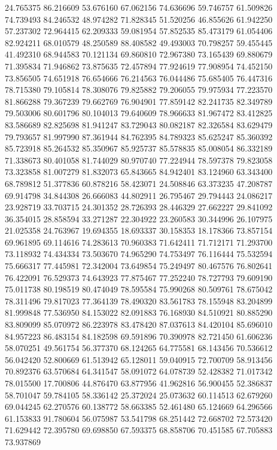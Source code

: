 24.765375
86.216609
53.676160
67.062156
74.636696
59.746757
61.509826
74.739493
84.246532
48.974282
71.828345
51.520256
46.855626
61.942250
57.237302
72.964415
62.209333
59.081954
57.852535
85.473179
61.054406
82.924211
68.010579
48.250589
88.408582
49.493003
70.798257
59.455445
41.492310
68.944583
70.121134
69.860810
72.967380
73.165439
69.880679
71.395834
71.946862
73.875635
72.457894
77.924619
77.908954
74.452150
73.856505
74.651918
76.654666
76.214563
76.044486
75.685405
76.447316
78.715380
79.105814
78.308076
79.825882
79.206055
79.975934
77.223570
81.866288
79.367239
79.662769
76.904901
77.859142
82.241735
82.349789
79.503006
80.601796
80.104013
79.640609
78.966633
81.967472
83.412825
83.586689
82.825698
81.941247
83.729043
80.082187
82.326584
83.629479
79.793657
81.997990
87.361944
84.762395
84.789323
85.625247
85.360392
85.723918
85.264532
85.350967
85.925737
85.578835
85.008054
86.332189
71.338673
80.401058
81.744029
80.970740
77.224944
78.597378
79.823058
73.323858
81.007279
81.832073
65.843665
84.942401
83.124960
63.343400
68.789812
51.377836
60.878216
58.423071
24.508846
63.373235
47.208787
69.914798
34.844308
26.666083
44.802911
26.795467
29.794443
24.086217
23.928719
33.703715
24.301352
28.726393
28.446329
27.662227
29.841092
36.354015
28.858594
33.271287
22.304922
23.260583
30.344996
26.107975
21.025358
24.763967
19.694355
18.693337
30.158353
18.178366
73.857154
69.961895
69.114616
74.283613
70.960383
71.642411
71.712171
71.293700
73.118932
74.434334
73.503670
74.965290
74.753497
76.116444
75.532594
75.666317
77.445981
72.342004
73.649854
75.249497
80.467576
76.802641
76.422091
76.529373
74.643923
77.875467
77.252240
78.727793
79.609190
75.011738
80.198519
80.474049
78.595584
75.990268
80.509761
78.675042
78.311496
79.817023
77.364139
78.490320
83.561783
78.155948
83.204899
81.999848
77.536950
84.153022
82.091883
76.168930
84.510921
80.885290
83.809099
85.070972
86.223978
83.478420
87.037613
84.420104
85.696010
84.957223
86.483154
84.182598
69.591896
70.390978
82.721450
61.606236
58.070251
49.561754
56.377370
68.124265
64.775581
68.143456
70.536612
56.042420
52.800669
61.513942
65.128011
59.040915
72.700709
58.913456
70.892376
63.570684
64.341547
58.091072
64.078739
52.428382
71.017342
78.015500
17.700806
44.876470
63.877956
41.962816
56.900455
52.386837
58.701047
59.784105
58.336142
25.372024
25.073632
60.114513
62.679260
69.044245
62.270576
60.138772
58.663385
52.461480
65.124669
64.296566
61.153833
91.780604
56.075987
53.541798
68.251442
72.668702
72.573420
71.629442
72.395780
69.698850
67.593375
68.858706
70.451585
67.705883
73.937869
